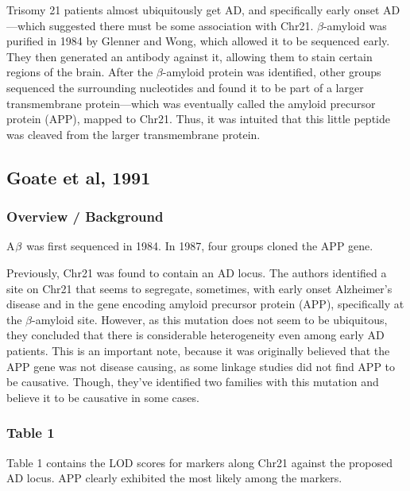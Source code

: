 Trisomy 21 patients almost ubiquitously get AD, and specifically early onset AD---which suggested there must be some association with Chr21. $\beta$-amyloid was purified in 1984 by Glenner and Wong, which allowed it to be sequenced early. They then generated an antibody against it, allowing them to stain certain regions of the brain. After the $\beta$-amyloid protein was identified, other groups sequenced the surrounding nucleotides and found it to be part of a larger transmembrane protein---which was eventually called the amyloid precursor protein (APP), mapped to Chr21. Thus, it was intuited that this little peptide was cleaved from the larger transmembrane protein. 


\subsection*{Goate et al, 1991} 

\subsubsection*{Overview / Background}

A$\beta$ was first sequenced in 1984. In 1987, four groups cloned the APP gene.\newline

Previously, Chr21 was found to contain an AD locus. The authors identified a site on Chr21 that seems to segregate, sometimes, with early onset Alzheimer's disease and in the gene encoding amyloid precursor protein (APP), specifically at the $\beta$-amyloid site. However, as this mutation does not seem to be ubiquitous, they concluded that there is considerable heterogeneity even among early AD patients. This is an important note, because it was originally believed that the APP gene was not disease causing, as some linkage studies did not find APP to be causative. Though, they've identified two families with this mutation and believe it to be causative in some cases.\newline

\subsubsection*{Table 1} Table 1 contains the LOD scores for markers along Chr21 against the proposed AD locus. APP clearly exhibited the most likely among the markers. 

